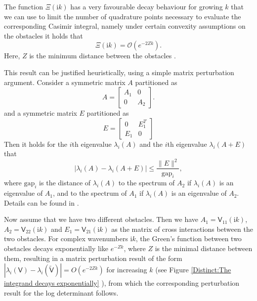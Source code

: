 The function $\Xi(\mathrm{i}k)$ has a very favourable decay behaviour for growing $k$ that we can use to limit the number of quadrature points necessary to evaluate the corresponding Casimir integral, namely under certain convexity assumptions on the obstacles it holds that
$$
\Xi(\mathrm{i}k) = \mathcal{O}(e^{-2Zk}).
$$
Here, $Z$ is the minimum distance between the obstacles  \cite[Theorem 4.1]{fang2022trace}.

This result can be justified heuristically, using a simple matrix perturbation argument. Consider a symmetric matrix $A$ partitioned as
$$
A = \begin{bmatrix}A_1 & 0\\
                              0   & A_2
       \end{bmatrix}.
$$
and a symmetric matrix $E$ partitioned as
$$
E= \begin{bmatrix}0 & E_1^T\\
     E_1 & 0
     \end{bmatrix}
$$
Then it holds for the $i$th eigenvalue $\lambda_i(A)$ and the $i$th eigenvalue $\lambda_i(A+E)$ that
$$
|\lambda_i(A) - \lambda_i(A+E)| \leq \frac{\|E\|^2}{\text{gap}_i},
$$
where $\text{gap}_i$ is the distance of $\lambda_i(A)$ to the spectrum of $A_2$ if $\lambda_i(A)$ is an eigenvalue of $A_1$, and to the spectrum of $A_1$ if $\lambda_i(A)$ is an eigenvalue of $A_2$. Details can be found in  
\cite{mathias1998quadratic}.

Now assume that we have two different obstacles. Then we have $A_1 = \mathsf{V}_{11}(\mathrm{i}k)$, $A_2 = \mathsf{V}_{22}(\mathrm{i}k)$ and $E_1 = \mathsf{V}_{21}(\mathrm{i}k)$ as the matrix of cross interactions 
between the two obstacles. For complex wavenumbers $\mathrm{i}k$, the Green's function between two obstacles decays exponentially like $e^{-Zk}$, where $Z$ is the minimal distance between them, 
resulting in a matrix perturbation result of the form $|\lambda_i(\mathsf{V}) - \lambda_i(\tilde{\mathsf{V}})| = O(e^{-2Zk})$ for increasing $k$ (see Figure \ref{Distinct:The integrand decays exponentially}
), from which the corresponding perturbation result for the log determinant follows.

